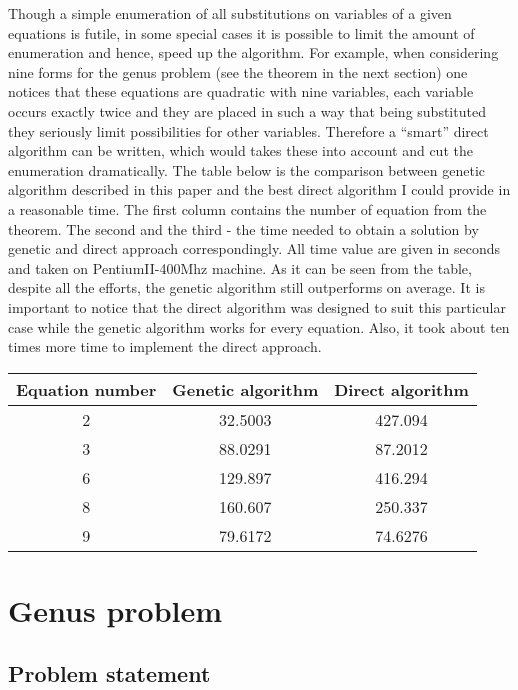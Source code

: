 \documentclass{article}
\begin{document}
Though a simple enumeration of all substitutions on variables of a
given equations is futile, in some special cases it is possible to
limit the amount of enumeration and hence, speed up the algorithm. For
example, when considering nine forms for the genus problem (see the
theorem in the next section) one notices that these equations are
quadratic with nine variables, each variable occurs exactly twice and
they are placed in such a way that being substituted they seriously
limit possibilities for other variables. Therefore a ``smart'' direct
algorithm can be written, which would takes these into account and cut
the enumeration dramatically. The table below is the comparison
between genetic algorithm described in this paper and the best direct
algorithm I could provide in a reasonable time. The first column
contains the number of equation from the theorem. The second and the
third - the time needed to obtain a solution by genetic and direct
approach correspondingly. All time value are given in seconds and
taken on PentiumII-400Mhz machine. As it can be seen from the table,
despite all the efforts, the genetic algorithm still outperforms on
average. It is important to notice that the direct algorithm was
designed to suit this particular case while the genetic algorithm
works for every equation. Also, it took about ten times more time to
implement the direct approach.

\vspace{3mm}
\noindent
\begin{tabular}{|c|c|c|} \hline
Equation number & Genetic algorithm & Direct algorithm \\ \hline
2 & 32.5003 & 427.094 \\ \hline
3 & 88.0291 & 87.2012 \\ \hline
6 & 129.897 & 416.294 \\ \hline
8 & 160.607 & 250.337 \\ \hline
9 & 79.6172 & 74.6276 \\ \hline
\end{tabular}
\vspace{3mm}



\section{Genus problem}

\subsection{Problem statement}
\end{document}
